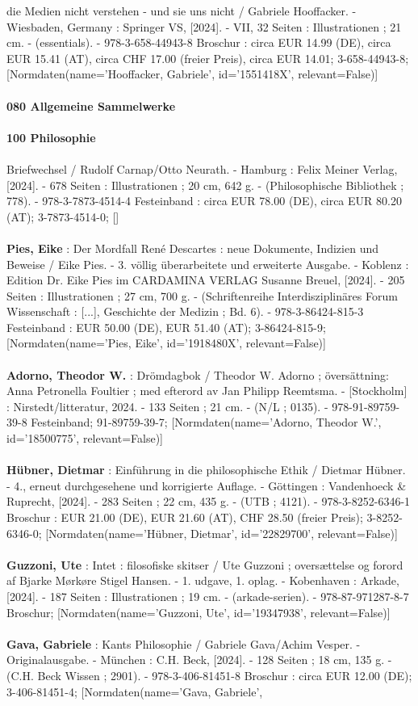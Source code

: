 \documentclass{article}
\begin{document}
\begin{multicols}{3}
die Medien nicht verstehen - und sie uns nicht / Gabriele Hooffacker. - Wiesbaden, Germany : Springer VS, [2024]. - VII, 32 Seiten : Illustrationen ; 21 cm. - (essentials). - 978-3-658-44943-8 Broschur : circa EUR 14.99 (DE), circa EUR 15.41 (AT), circa CHF 17.00 (freier Preis), circa EUR 14.01; 3-658-44943-8; [Normdaten(name='Hooffacker, Gabriele', id='1551418X', relevant=False)]\\\\\textbf{080 Allgemeine Sammelwerke}\\\\\textbf{100 Philosophie}\\\\Briefwechsel / Rudolf Carnap/Otto Neurath. - Hamburg : Felix Meiner Verlag, [2024]. - 678 Seiten : Illustrationen ; 20 cm, 642 g. - (Philosophische Bibliothek ; 778). - 978-3-7873-4514-4 Festeinband : circa EUR 78.00 (DE), circa EUR 80.20 (AT); 3-7873-4514-0; []\\\\\textbf{Pies, Eike} : Der Mordfall René Descartes : neue Dokumente, Indizien und Beweise / Eike Pies. - 3. völlig überarbeitete und erweiterte Ausgabe. - Koblenz : Edition Dr. Eike Pies im CARDAMINA VERLAG Susanne Breuel, [2024]. - 205 Seiten : Illustrationen ; 27 cm, 700 g. - (Schriftenreihe Interdisziplinäres Forum Wissenschaft : [...], Geschichte der Medizin ; Bd. 6). - 978-3-86424-815-3 Festeinband : EUR 50.00 (DE), EUR 51.40 (AT); 3-86424-815-9; [Normdaten(name='Pies, Eike', id='1918480X', relevant=False)]\\\\\textbf{Adorno, Theodor W.} : Drömdagbok / Theodor W. Adorno ; översättning: Anna Petronella Foultier ; med efterord av Jan Philipp Reemtsma. - [Stockholm] : Nirstedt/litteratur, 2024. - 133 Seiten ; 21 cm. - (N/L ; 0135). - 978-91-89759-39-8 Festeinband; 91-89759-39-7; [Normdaten(name='Adorno, Theodor W.', id='18500775', relevant=False)]\\\\\textbf{Hübner, Dietmar} : Einführung in die philosophische Ethik / Dietmar Hübner. - 4., erneut durchgesehene und korrigierte Auflage. - Göttingen : Vandenhoeck \& Ruprecht, [2024]. - 283 Seiten ; 22 cm, 435 g. - (UTB ; 4121). - 978-3-8252-6346-1 Broschur : EUR 21.00 (DE), EUR 21.60 (AT), CHF 28.50 (freier Preis); 3-8252-6346-0; [Normdaten(name='Hübner, Dietmar', id='22829700', relevant=False)]\\\\\textbf{Guzzoni, Ute} : Intet : filosofiske skitser / Ute Guzzoni ; oversættelse og forord af Bjarke Mørkøre Stigel Hansen. - 1. udgave, 1. oplag. - Kobenhaven : Arkade, [2024]. - 187 Seiten : Illustrationen ; 19 cm. - (arkade-serien). - 978-87-971287-8-7 Broschur; [Normdaten(name='Guzzoni, Ute', id='19347938', relevant=False)]\\\\\textbf{Gava, Gabriele} : Kants Philosophie / Gabriele Gava/Achim Vesper. - Originalausgabe. - München : C.H. Beck, [2024]. - 128 Seiten ; 18 cm, 135 g. - (C.H. Beck Wissen ; 2901). - 978-3-406-81451-8 Broschur : circa EUR 12.00 (DE); 3-406-81451-4; [Normdaten(name='Gava, Gabriele', 
\end{multicols}
\end{document}

